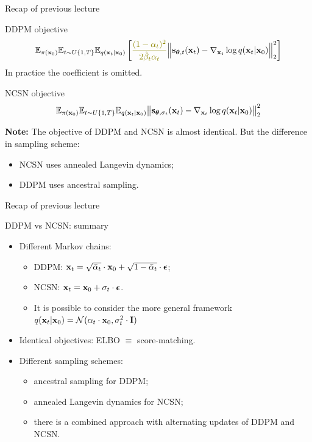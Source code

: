 \begin{frame}{Recap of previous lecture}
	\begin{block}{DDPM objective}
		\vspace{-0.5cm}
		\[
			\bbE_{\pi(\bx_0)} \bbE_{t \sim U\{1, T\}}\bbE_{q(\bx_t | \bx_0)} \left[ {\color{olive}\frac{(1 - \alpha_t)^2}{2\tilde{\beta}_t \alpha_t}} \Bigl\|  \bs_{\btheta, t} (\bx_t) - \nabla_{\bx_t} \log q(\bx_t | \bx_0) \Bigr\|_2^2  \right]
		\]
		In practice {\color{olive}the coefficient} is omitted.
	\end{block}
	\begin{block}{NCSN objective}
		\vspace{-0.3cm}
		\[
			\mathbb{E}_{\pi(\mathbf{x}_0)} \mathbb{E}_{t \sim U\{1, T\}} \mathbb{E}_{q(\mathbf{x}_t | \mathbf{x}_0)}\bigl\| \mathbf{s}_{\boldsymbol{\theta}, \sigma_t}(\mathbf{x}_t) - \nabla_{\mathbf{x}_t} \log q(\mathbf{x}_t | \mathbf{x}_0) \bigr\|^2_2 
		\]
		\vspace{-0.3cm}
	\end{block}
	\textbf{Note:} The objective of DDPM and NCSN is almost identical. But the difference in sampling scheme:
	\begin{itemize}
		\item NCSN uses annealed Langevin dynamics;
		\item DDPM uses ancestral sampling.
	\end{itemize}
	\end{frame}
\begin{frame}{Recap of previous lecture}
	\begin{block}{DDPM vs NCSN: summary}
		\begin{itemize}
		\item Different Markov chains:
			\begin{itemize}
				\item DDPM: $\mathbf{x}_t = \sqrt{\bar{\alpha}_t} \cdot \mathbf{x}_0 + \sqrt{1 - \bar{\alpha}_t} \cdot \boldsymbol{\epsilon}$;
				\item NCSN: $\mathbf{x}_t = \mathbf{x}_0 + \sigma_t \cdot \boldsymbol{\epsilon}$.
				\item It is possible to consider the more general framework $q(\mathbf{x}_t |\mathbf{x}_0) = \mathcal{N}(\alpha_t \cdot \mathbf{x}_0, \sigma^2_t\cdot \mathbf{I})$
			\end{itemize}
		\item Identical objectives: ELBO $\equiv$ score-matching.
		\item Different sampling schemes:
			\begin{itemize}
				\item ancestral sampling for DDPM;
				\item annealed Langevin dynamics for NCSN;
				\item there is a combined approach with alternating updates of DDPM and NCSN.
			\end{itemize}
		\end{itemize}
	\end{block}
\end{frame}
